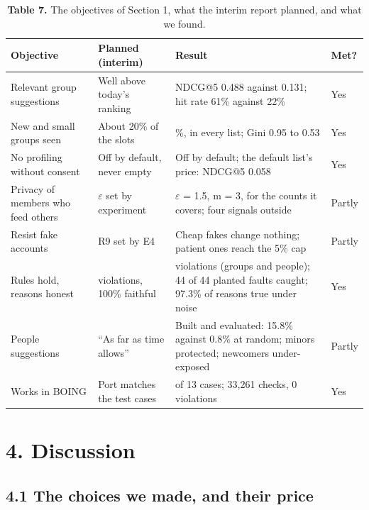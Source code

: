 \documentclass[11pt,letterpaper]{article}
\newcommand{\rowrule}{\midrule[0.2pt]}
\begin{document}
\begin{table}[!htbp]
\centering
\caption*{\textbf{Table 7.} The objectives of Section 1, what the interim report planned, and what we found.}
\scriptsize
\begin{tabular}{
  >{\raggedright\arraybackslash}p{}
  >{\raggedright\arraybackslash}p{}
  >{\raggedright\arraybackslash}p{}
  >{\raggedright\arraybackslash}p{}
}
\toprule
\textbf{Objective} & \textbf{Planned (interim)} & \textbf{Result} & \textbf{Met?} \\
\midrule
Relevant group suggestions & Well above today's ranking & NDCG@5 0.488 against 0.131; hit rate 61\% against 22\% & Yes \\
\rowrule
New and small groups seen & About 20\% of the slots & 20.8\%, in every list; Gini 0.95 to 0.53 & Yes \\
\rowrule
No profiling without consent & Off by default, never empty & Off by default; the default list's price: NDCG@5 0.058 & Yes \\
\rowrule
Privacy of members who feed others & $\varepsilon$ set by experiment & $\varepsilon$ = 1.5, m = 3, for the counts it covers; four signals outside & Partly \\
\rowrule
Resist fake accounts & R9 set by E4 & Cheap fakes change nothing; patient ones reach the 5\% cap & Partly \\
\rowrule
Rules hold, reasons honest & 0 violations, 100\% faithful & 0 violations (groups and people); 44 of 44 planted faults caught; 97.3\% of reasons true under noise & Yes \\
\rowrule
People suggestions & ``As far as time allows'' & Built and evaluated: 15.8\% against 0.8\% at random; minors protected; newcomers under-exposed & Partly \\
\rowrule
Works in BOING & Port matches the test cases & 13 of 13 cases; 33,261 checks, 0 violations & Yes \\
\bottomrule
\end{tabular}
\end{table}

\section{4. Discussion}

\subsection{4.1 The choices we made, and their price}
\end{document}
